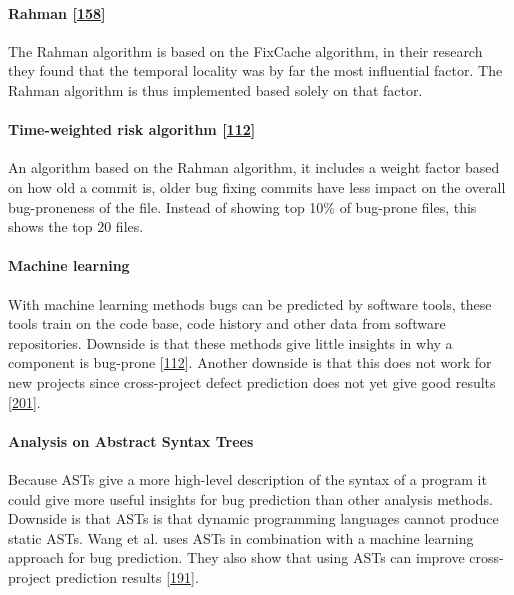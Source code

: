 \documentclass[]{book}
\let\oldparagraph\paragraph
\renewcommand{\paragraph}[1]{\oldparagraph{#1}\mbox{}}
\begin{document}
\paragraph{\texorpdfstring{Rahman
{[}\protect\hyperlink{ref-rahman2011}{158}{]}}{Rahman {[}158{]}}}\label{rahman-rahman2011}

The Rahman algorithm is based on the FixCache algorithm, in their
research they found that the temporal locality was by far the most
influential factor. The Rahman algorithm is thus implemented based
solely on that factor.

\paragraph{\texorpdfstring{Time-weighted risk algorithm
{[}\protect\hyperlink{ref-Lewis2013}{112}{]}}{Time-weighted risk algorithm {[}112{]}}}\label{time-weighted-risk-algorithm-lewis2013}

An algorithm based on the Rahman algorithm, it includes a weight factor
based on how old a commit is, older bug fixing commits have less impact
on the overall bug-proneness of the file. Instead of showing top 10\% of
bug-prone files, this shows the top 20 files.

\paragraph{Machine learning}\label{machine-learning}

With machine learning methods bugs can be predicted by software tools,
these tools train on the code base, code history and other data from
software repositories. Downside is that these methods give little
insights in why a component is bug-prone
{[}\protect\hyperlink{ref-Lewis2013}{112}{]}. Another downside is that
this does not work for new projects since cross-project defect
prediction does not yet give good results
{[}\protect\hyperlink{ref-zimmermann2009}{201}{]}.

\paragraph{Analysis on Abstract Syntax
Trees}\label{analysis-on-abstract-syntax-trees}

Because ASTs give a more high-level description of the syntax of a
program it could give more useful insights for bug prediction than other
analysis methods. Downside is that ASTs is that dynamic programming
languages cannot produce static ASTs. Wang et al. uses ASTs in
combination with a machine learning approach for bug prediction. They
also show that using ASTs can improve cross-project prediction results
{[}\protect\hyperlink{ref-wang2016}{191}{]}.
\end{document}
